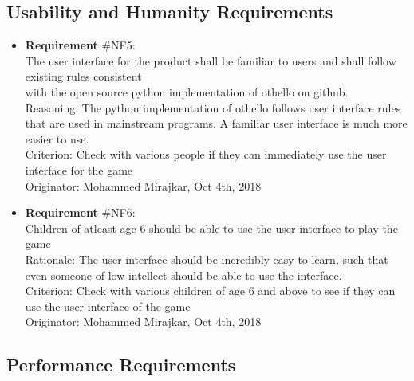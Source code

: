 \documentclass[12pt, titlepage]{article}
\renewcommand{\bf}{\textbf}
\begin{document}
\subsection{Usability and Humanity Requirements}

\begin{itemize}
	\item  {\color {blue}\bf{ Requirement}} \#NF{\color {blue}5:}\\
	      The user interface for the product shall be familiar to users and shall follow existing rules consistent\\
	      with the open source python implementation of othello on github.\\
	      Reasoning: The python implementation of othello follows user interface rules that are used in mainstream programs. A familiar user interface is much more easier to use.\\
	      Criterion: Check with various people if they can immediately use the user interface for the game\\
	      Originator: Mohammed Mirajkar, Oct 4th, 2018

	\item  {\color {blue}\bf{ Requirement}} \#NF{\color {blue}6:}\\
	      Children of atleast age 6 should be able to use the user interface to play the game\\
	      Rationale: The user interface should be incredibly easy to learn, such that even someone of low intellect should be able to use the interface.\\
	      Criterion: Check with various children of age 6  and above to see if they can use the user interface of the game\\
	      Originator: Mohammed Mirajkar, Oct 4th, 2018
\end{itemize}

\subsection{Performance Requirements}
\end{document}
